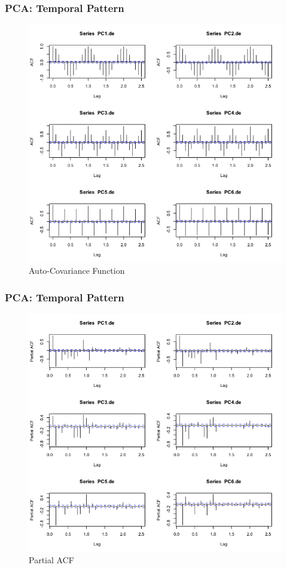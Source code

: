 \documentclass{beamer}
\begin{document}
\begin{frame}
\frametitle{PCA: Temporal Pattern}
\begin{figure}
\centering
\includegraphics[width=0.7\linewidth]{../img/PCAde_ACF}
\caption{Auto-Covariance Function}
\label{fig:pcadeacf}
\end{figure}
\end{frame}

\begin{frame}
\frametitle{PCA: Temporal Pattern}
\begin{figure}
\centering
\includegraphics[width=0.7\linewidth]{../img/PCAde_pacf}
\caption{Partial ACF}
\label{fig:pcadpeacf}
\end{figure}
\end{frame}
\end{document}
